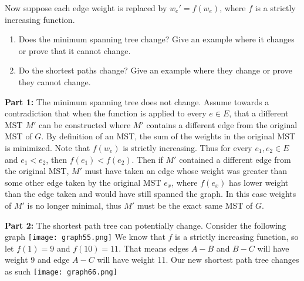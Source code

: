 \documentclass[11pt]{article}
\begin{document}
\begin{flushleft}
	Now suppose each edge weight is replaced by $w_e'=f(w_e)$,
	where $f$ is a strictly increasing function.
	\begin{enumerate}
		\item
		Does the minimum spanning tree change? Give an example
		where it changes or prove that it cannot change.
		\item
		Do the shortest paths change? Give an example where they
		change or prove they cannot change.
	\end{enumerate}

	\textbf{Part 1: }The minimum spanning tree does not change. Assume towards a contradiction that when the function is applied to every $e \in E$, that a different MST $M'$ can be constructed where $M'$ contains a different edge from the original MST of $G$. By definition of an MST, the sum of the weights in the original MST is minimized. Note that $f(w_e)$ is strictly increasing. Thus for every $e_1, e_2 \in E$ and $e_1 < e_2$, then $f(e_1) < f(e_2)$. Then if $M'$ contained a different edge from the original MST, $M'$ must have taken an edge whose weight was greater than some other edge taken by the original MST $e_x$, where $f(e_x)$ has lower weight than the edge taken and would have still spanned the graph. In this case weights of $M'$ is no longer minimal, thus $M'$ must be the exact same MST of $G$. 
	
	\textbf{Part 2: }The shortest path tree can potentially change. Consider the following graph
	\newline
	\texttt{[image: graph55.png]}
	\newline
	We know that $f$ is a strictly increasing function, so let $f(1) = 9$ and $f(10) = 11$. That means edges $A - B$ and $B - C$ will have weight 9 and edge $A - C$ will have weight 11. Our new shortest path tree changes as such
	\newline
	\texttt{[image: graph66.png]}
\end{flushleft}
\end{document}
